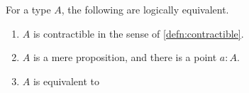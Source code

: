 \documentclass[hott-all.tex]{subfiles}
\begin{document}
%

\begin{lem}
  For a type $A$, the following are logically equivalent.
  \begin{enumerate}
  \item $A$ is contractible in the sense of \cref{defn:contractible}.
  \item $A$ is a mere proposition, and there is a point $a:A$.
  \item $A$ is equivalent to \unit.
  \end{enumerate}
\end{lem}
%
\end{document}
